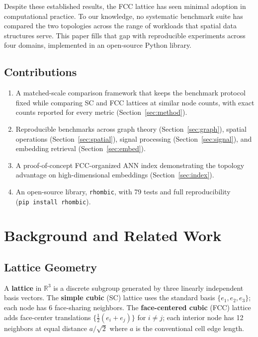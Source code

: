 \documentclass[11pt]{article}
\begin{document}
Despite these established results, the FCC lattice has seen minimal
adoption in computational practice. To our knowledge, no systematic
benchmark suite has compared the two topologies across the range of workloads that
spatial data structures serve. This paper fills that gap with
reproducible experiments across four domains, implemented in an
open-source Python library.

\subsection{Contributions}

\begin{enumerate}
  \item A matched-scale comparison framework that keeps the benchmark
    protocol fixed while comparing SC and FCC lattices at similar node
    counts, with exact counts reported for every metric
    (Section~\ref{sec:method}).
  \item Reproducible benchmarks across graph theory
    (Section~\ref{sec:graph}), spatial operations
    (Section~\ref{sec:spatial}), signal processing
    (Section~\ref{sec:signal}), and embedding retrieval
    (Section~\ref{sec:embed}).
  \item A proof-of-concept FCC-organized ANN index demonstrating
    the topology advantage on high-dimensional embeddings
    (Section~\ref{sec:index}).
  \item An open-source library, \texttt{rhombic}, with 79 tests
    and full reproducibility (\texttt{pip~install~rhombic}).
\end{enumerate}

\section{Background and Related Work}
\label{sec:background}

\subsection{Lattice Geometry}

A \textbf{lattice} in $\mathbb{R}^3$ is a discrete subgroup
generated by three linearly independent basis vectors. The
\textbf{simple cubic} (SC) lattice uses the standard basis
$\{e_1, e_2, e_3\}$; each node has 6 face-sharing neighbors.
The \textbf{face-centered cubic} (FCC) lattice adds face-center
translations $\{\frac{1}{2}(e_i + e_j)\}$ for $i \neq j$; each
interior node has 12 neighbors at equal distance $a/\sqrt{2}$
where $a$ is the conventional cell edge length.
\end{document}
